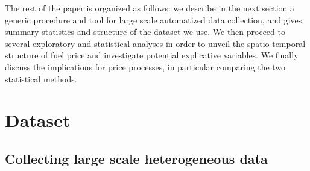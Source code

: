 \documentclass[3p,times,procedia]{elsarticle}
\begin{document}




The rest of the paper is organized as follows: we describe in the next section a generic procedure and tool for large scale automatized data collection, and gives summary statistics and structure of the dataset we use. We then proceed to several exploratory and statistical analyses in order to unveil the spatio-temporal structure of fuel price and investigate potential explicative variables. We finally discuss the implications for price processes, in particular comparing the two statistical methods.



\section{Dataset}

\subsection{Collecting large scale heterogeneous data}
\end{document}
